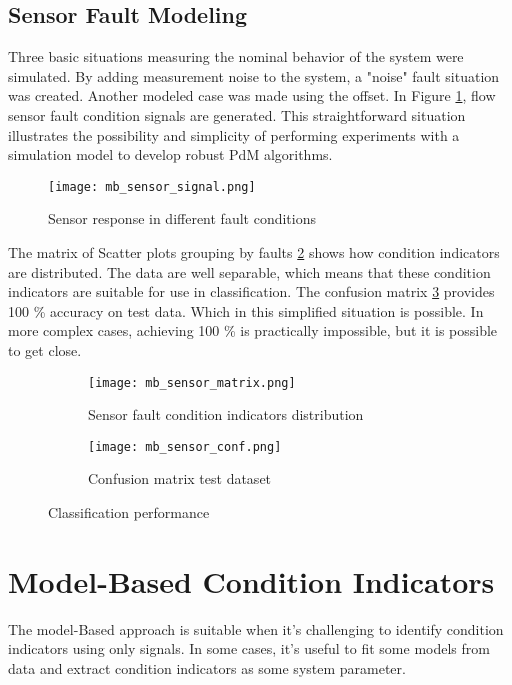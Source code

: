 \subsection{Sensor Fault Modeling}

Three basic situations measuring the nominal behavior of the system were
simulated. By adding measurement noise to the system, a "noise" fault
situation was created. Another modeled case was made using the offset.  In
Figure \ref{fig:mb_sensor_faults_signal}, flow sensor fault condition
signals are generated. This straightforward situation illustrates the
possibility and simplicity of performing experiments with a simulation
model to develop robust PdM algorithms.

\begin{figure}[h!]
    \centering
    \texttt{[image: mb\_sensor\_signal.png]}
    \caption{Sensor response in different fault conditions}
    \label{fig:mb_sensor_faults_signal}
\end{figure}


The matrix of Scatter plots grouping by faults \ref{fig:mb_sensor_matrix} shows how condition
indicators are distributed. The data are well separable, which means that
these condition indicators are suitable for use in classification. The
confusion matrix \ref{fig:mb_sensor_conf} provides 100 \% accuracy on test data. Which in this
simplified situation is possible. In more complex cases, achieving 100 \% is
practically impossible, but it is possible to get close.

\begin{figure}
    \centering
    \begin{subfigure}[b]{0.45\textwidth}
        \centering
        \texttt{[image: mb\_sensor\_matrix.png]}
        \caption{Sensor fault condition indicators distribution}
        \label{fig:mb_sensor_matrix}
    \end{subfigure}
    \hfill
    \begin{subfigure}[b]{0.45\textwidth}
        \centering
        \texttt{[image: mb\_sensor\_conf.png]}
        \caption{Confusion matrix test dataset}
        \label{fig:mb_sensor_conf}
    \end{subfigure}
    \caption{Classification performance}
    \label{fig:sensor_fault_final}
\end{figure}



\section{Model-Based Condition Indicators}
The model-Based approach is suitable when it's challenging to identify
condition indicators using only signals. In some cases, it's useful to fit
some models from data and extract condition indicators as some system
parameter.

